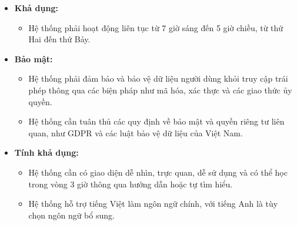\begin{itemize}
	\item \textbf{Khả dụng:}
	      \begin{itemize}
		      \item Hệ thống phải hoạt động liên tục từ 7 giờ sáng đến 5 giờ chiều, từ thứ Hai đến thứ Bảy.
	      \end{itemize}
	\item \textbf{Bảo mật:}
	      \begin{itemize}
		      \item Hệ thống phải đảm bảo và bảo vệ dữ liệu người dùng khỏi truy cập trái phép thông qua các biện pháp như mã hóa, xác thực và các giao thức ủy quyền.
		      \item Hệ thống cần tuân thủ các quy định về bảo mật và quyền riêng tư liên quan, như GDPR và các luật bảo vệ dữ liệu của Việt Nam.
	      \end{itemize}
	\item \textbf{Tính khả dụng:}
	      \begin{itemize}
		      \item Hệ thống cần có giao diện dễ nhìn, trực quan, dễ sử dụng và có thể học trong vòng 3 giờ thông qua hướng dẫn hoặc tự tìm hiểu.
		      \item Hệ thống hỗ trợ tiếng Việt làm ngôn ngữ chính, với tiếng Anh là tùy chọn ngôn ngữ bổ sung.
	      \end{itemize}
\end{itemize}















